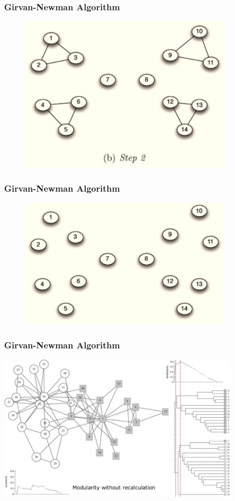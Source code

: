 \documentclass[xcolor={dvipsnames}]{beamer}
\begin{document}
\frame
{
\frametitle{Girvan-Newman Algorithm}

\begin{figure}
\includegraphics[width=4.065in]{stuff/gnm3.jpg}
\end{figure}

}


\frame
{
\frametitle{Girvan-Newman Algorithm}

\vspace{-1.5em}

\begin{figure}
\includegraphics[width=4.04in]{stuff/gnm4.jpg}
\end{figure}

}

\frame
{
\frametitle{Girvan-Newman Algorithm}

\hspace*{-1em}\includegraphics[width=4.6in]{stuff/gnm6.jpg}

}


 
\end{document}
